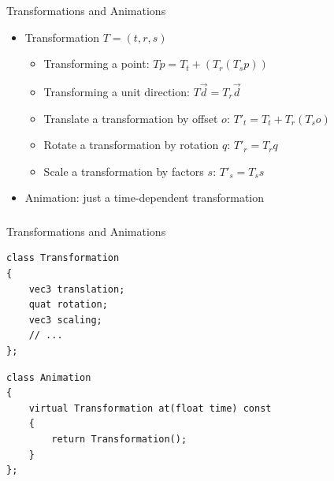 \documentclass[utf8,stillsansserifmath,fleqn,t]{beamer}
\begin{document}
\begin{frame}
\frametitle{\insertsection}
Transformations and Animations
\begin{itemize}
\item Transformation $T=(t,r,s)$
    \begin{itemize}
    \item Transforming a point: $Tp = T_t +  (T_r (T_s p))$
    \item Transforming a unit direction: $T\vec{d} = T_r \vec{d}$
    \item Translate a transformation by offset $o$: $T'_t = T_t + T_r (T_s o)$
    \item Rotate a transformation by rotation $q$: $T'_r = T_r  q$
    \item Scale a transformation by factors $s$: $T'_s = T_s s$
    \end{itemize}
\item Animation: just a time-dependent transformation
\end{itemize}
\end{frame}

\begin{frame}[fragile,label=transf-and-anim-1]
\frametitle{\insertsection}
Transformations and Animations
\begin{lstlisting}
class Transformation
{
    vec3 translation;
    quat rotation;
    vec3 scaling;
    // ...
};
\end{lstlisting}
\begin{lstlisting}
class Animation
{
    virtual Transformation at(float time) const
    {
        return Transformation();
    }
};
\end{lstlisting}
\end{frame}
\end{document}
